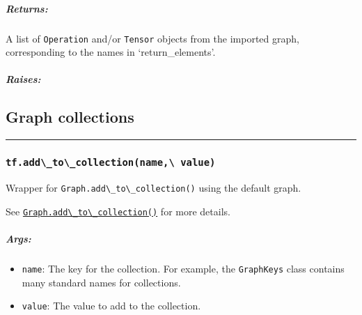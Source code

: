 \subparagraph{Returns: }\label{returns-29}

A list of \lstinline{Operation} and/or \lstinline{Tensor} objects from the
imported graph, corresponding to the names in `return\_elements'.

\subparagraph{Raises: }\label{raises-15}


\subsection{Graph collections }\label{graph-collections}

\begin{center}\rule{0.5\linewidth}{\linethickness}\end{center}

\subsubsection{\texorpdfstring{\lstinline{tf.add\_to\_collection(name,\ value)}
}{tf.add\_to\_collection(name, value) }}\label{tf.addux5ftoux5fcollectionname-value}

Wrapper for \lstinline{Graph.add\_to\_collection()} using the default
graph.

See
\href{../../api_docs/python/framework.md\#Graph.add_to_collection}{\lstinline{Graph.add\_to\_collection()}}
for more details.

\subparagraph{Args: }\label{args-26}

\begin{itemize}
\tightlist
\item
  \lstinline{name}: The key for the collection. For example, the
  \lstinline{GraphKeys} class contains many standard names for collections.
\item
  \lstinline{value}: The value to add to the collection.
\end{itemize}

